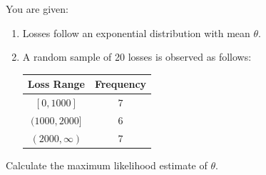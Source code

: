 \begin{mdframed}
    \begin{Exercise}
        You are given:
        \begin{enumerate}
            \item Losses follow an exponential distribution with mean $\theta$.
            \item A random sample of 20 losses is observed as follows:
            \begin{center}
                \begin{tabular}{|c|c|}
                    \hline
                    Loss Range & Frequency\\
                    \hline
                    $[0,1000]$ & $7$\\
                    $(1000, 2000]$ & $6$\\
                    $(2000, \infty)$ & $7$\\
                    \hline
                \end{tabular}
            \end{center}
        \end{enumerate}
        Calculate the maximum likelihood estimate of $\theta$.
    \end{Exercise}
\end{mdframed}